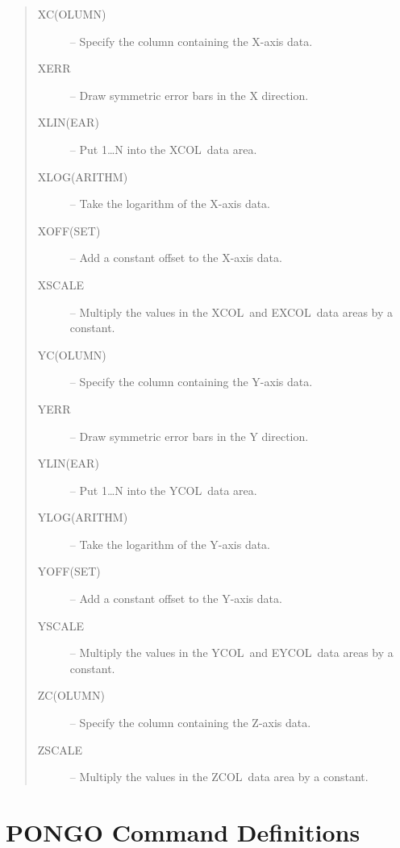 \documentclass[twoside,11pt]{article}
\newcommand{\htmlref}[2]{#1}
\renewcommand{\_}{\texttt{\symbol{95}}}
\newcommand{\xcol}{{\sf XCOL}}
\newcommand{\excol}{{\sf EXCOL}}
\newcommand{\ycol}{{\sf YCOL}}
\newcommand{\eycol}{{\sf EYCOL}}
\newcommand{\zcol}{{\sf ZCOL}}
\newcommand{\iref} [1]{\htmlref{#1}{#1}}
\newcommand{\iiref}[2]{\htmlref{#1}{#2}}
\begin{document}
\begin {quote}
\begin {description}
\item [\iiref{XC(OLUMN)}{XCOLUMN}] -- Specify the column containing the
                                      X-axis data.
\item [\iref{XERR}] -- Draw symmetric error bars in the X direction.
\item [\iiref{XLIN(EAR)}{XLINEAR}] -- Put 1\ldots N into the \xcol\ data area.
\item [\iiref{XLOG(ARITHM)}{XLOGARITHM}] -- Take the logarithm of the
                                            X-axis data.
\item [\iiref{XOFF(SET)}{XOFFSET}] -- Add a constant offset to the
                                      X-axis data.
\item [\iref{XSCALE}] -- Multiply the values in the \xcol\ and \excol\ data areas
                         by a constant.
\item [\iiref{YC(OLUMN)}{YCOLUMN}] -- Specify the column containing the
                                      Y-axis data.
\item [\iref{YERR}] -- Draw symmetric error bars in the Y direction.
\item [\iiref{YLIN(EAR)}{YLINEAR}] -- Put 1\ldots N into the \ycol\ data
                                      area.
\item [\iiref{YLOG(ARITHM)}{YLOGARITHM}] -- Take the logarithm of the
                                            Y-axis data.
\item [\iiref{YOFF(SET)}{YOFFSET}] -- Add a constant offset to the
                                      Y-axis data.
\item [\iref{YSCALE}] -- Multiply the values in the \ycol\ and \eycol\ data areas
                         by a constant.
\item [\iiref{ZC(OLUMN)}{ZCOLUMN}] -- Specify the column containing the
                                      Z-axis data.
\item [\iref{ZSCALE}] -- Multiply the values in the \zcol\ data area by a
                         constant.
\end {description}
\end {quote}
\normalsize

\newpage
\section{PONGO Command Definitions} \label{defn_sect}
\end{document}
